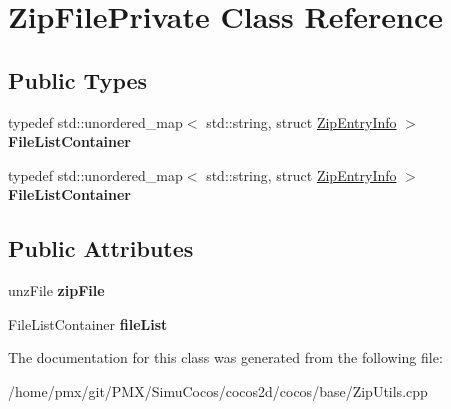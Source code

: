 \hypertarget{classZipFilePrivate}{}\section{Zip\+File\+Private Class Reference}
\label{classZipFilePrivate}
\subsection*{Public Types}
\begin{DoxyCompactItemize}
\item 
\mbox{\label{classZipFilePrivate_a0cf66558c1d527ca598baddc0bb38a3e}} 
typedef std\+::unordered\+\_\+map$<$ std\+::string, struct \hyperlink{structZipEntryInfo}{Zip\+Entry\+Info} $>$ {\bfseries File\+List\+Container}
\item 
\mbox{\label{classZipFilePrivate_a0cf66558c1d527ca598baddc0bb38a3e}} 
typedef std\+::unordered\+\_\+map$<$ std\+::string, struct \hyperlink{structZipEntryInfo}{Zip\+Entry\+Info} $>$ {\bfseries File\+List\+Container}
\end{DoxyCompactItemize}
\subsection*{Public Attributes}
\begin{DoxyCompactItemize}
\item 
\mbox{\label{classZipFilePrivate_a02e1c95760c00a7dfb9e6ff0159fbe97}} 
unz\+File {\bfseries zip\+File}
\item 
\mbox{\label{classZipFilePrivate_a153b5bcd7b7dcf8d90c23f79c78c993d}} 
File\+List\+Container {\bfseries file\+List}
\end{DoxyCompactItemize}


The documentation for this class was generated from the following file\+:\begin{DoxyCompactItemize}
\item 
/home/pmx/git/\+P\+M\+X/\+Simu\+Cocos/cocos2d/cocos/base/Zip\+Utils.\+cpp\end{DoxyCompactItemize}

